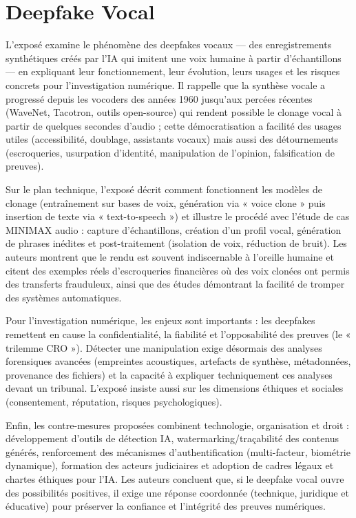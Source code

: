 \documentclass[11pt,a4paper]{article}
\begin{document}
	
	
	
	\section{ Deepfake Vocal}
	\vspace{0.5cm}
	L’exposé examine le phénomène des deepfakes vocaux — des enregistrements synthétiques créés par l’IA qui imitent une voix humaine à partir d’échantillons — en expliquant leur fonctionnement, leur évolution, leurs usages et les risques concrets pour l’investigation numérique.  Il rappelle que la synthèse vocale a progressé depuis les vocoders des années 1960 jusqu’aux percées récentes (WaveNet, Tacotron, outils open-source) qui rendent possible le clonage vocal à partir de quelques secondes d’audio ; cette démocratisation a facilité des usages utiles (accessibilité, doublage, assistants vocaux) mais aussi des détournements (escroqueries, usurpation d’identité, manipulation de l’opinion, falsification de preuves).
	
	Sur le plan technique, l’exposé décrit comment fonctionnent les modèles de clonage (entraînement sur bases de voix, génération via « voice clone » puis insertion de texte via « text-to-speech ») et illustre le procédé avec l’étude de cas MINIMAX audio : capture d’échantillons, création d’un profil vocal, génération de phrases inédites et post-traitement (isolation de voix, réduction de bruit). Les auteurs montrent que le rendu est souvent indiscernable à l’oreille humaine et citent des exemples réels d’escroqueries financières où des voix clonées ont permis des transferts frauduleux, ainsi que des études démontrant la facilité de tromper des systèmes automatiques.
	
	Pour l’investigation numérique, les enjeux sont importants : les deepfakes remettent en cause la confidentialité, la fiabilité et l’opposabilité des preuves (le « trilemme CRO »). Détecter une manipulation exige désormais des analyses forensiques avancées (empreintes acoustiques, artefacts de synthèse, métadonnées, provenance des fichiers) et la capacité à expliquer techniquement ces analyses devant un tribunal. L’exposé insiste aussi sur les dimensions éthiques et sociales (consentement, réputation, risques psychologiques).
	
	Enfin, les contre-mesures proposées combinent technologie, organisation et droit : développement d’outils de détection IA, watermarking/traçabilité des contenus générés, renforcement des mécanismes d’authentification (multi-facteur, biométrie dynamique), formation des acteurs judiciaires et adoption de cadres légaux et chartes éthiques pour l’IA. Les auteurs concluent que, si le deepfake vocal ouvre des possibilités positives, il exige une réponse coordonnée (technique, juridique et éducative) pour préserver la confiance et l’intégrité des preuves numériques.
	
\end{document}
